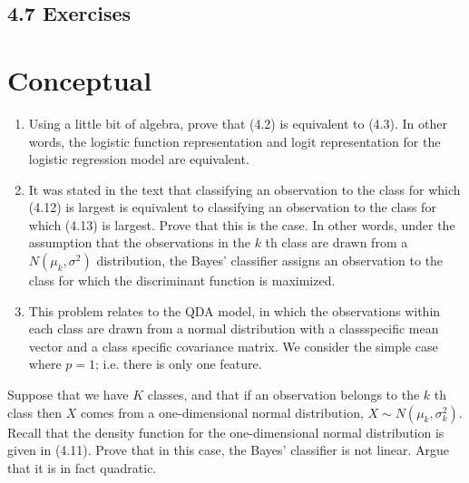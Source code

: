 \documentclass[10pt]{article}
\begin{document}
\subsection*{4.7 Exercises}
\section*{Conceptual}
\begin{enumerate}
  \item Using a little bit of algebra, prove that (4.2) is equivalent to (4.3). In other words, the logistic function representation and logit representation for the logistic regression model are equivalent.
  \item It was stated in the text that classifying an observation to the class for which (4.12) is largest is equivalent to classifying an observation to the class for which (4.13) is largest. Prove that this is the case. In other words, under the assumption that the observations in the $k$ th class are drawn from a $N\left(\mu_{k}, \sigma^{2}\right)$ distribution, the Bayes' classifier assigns an observation to the class for which the discriminant function is maximized.
  \item This problem relates to the QDA model, in which the observations within each class are drawn from a normal distribution with a classspecific mean vector and a class specific covariance matrix. We consider the simple case where $p=1$; i.e. there is only one feature.
\end{enumerate}

Suppose that we have $K$ classes, and that if an observation belongs to the $k$ th class then $X$ comes from a one-dimensional normal distribution, $X \sim N\left(\mu_{k}, \sigma_{k}^{2}\right)$. Recall that the density function for the one-dimensional normal distribution is given in (4.11). Prove that in this case, the Bayes' classifier is not linear. Argue that it is in fact quadratic.
\end{document}
